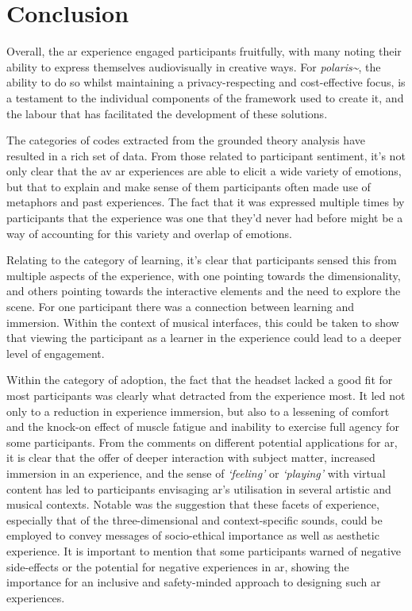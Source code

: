 


\section{Conclusion}\label{sec: polaris-conclusion}
Overall, the \gls{ar} experience engaged participants fruitfully, with many noting their ability to express themselves audiovisually in creative ways. For \textit{polaris\textasciitilde{}}, the ability to do so whilst maintaining a privacy-respecting and cost-effective focus, is a testament to the individual components of the framework used to create it, and the labour that has facilitated the development of these  solutions.

The categories of codes extracted from the grounded theory analysis have resulted in a rich set of data. From those related to participant sentiment, it's not only clear that the \gls{av} \gls{ar} experiences are able to elicit a wide variety of emotions, but that to explain and make sense of them participants often made use of metaphors and past experiences. The fact that it was expressed multiple times by participants that the experience was one that they'd never had before might be a way of accounting for this variety and overlap of emotions.

Relating to the category of learning, it's clear that participants sensed this from multiple aspects of the experience, with one pointing towards the dimensionality, and others pointing towards the interactive elements and the need to explore the scene. For one participant there was a connection between learning and immersion. Within the context of musical interfaces, this could be taken to show that viewing the participant as a learner in the experience could lead to a deeper level of engagement.

Within the category of adoption, the fact that the headset lacked a good fit for most participants was clearly what detracted from the experience most. It led not only to a reduction in experience immersion, but also to a lessening of comfort and the knock-on effect of muscle fatigue and inability to exercise full agency for some participants. From the comments on different potential applications for \gls{ar}, it is clear that the offer of deeper interaction with subject matter, increased immersion in an experience, and the sense of \textit{`feeling'} or \textit{`playing'} with virtual content has led to participants envisaging \gls{ar}'s utilisation in several artistic and musical contexts. Notable was the suggestion that these facets of experience, especially that of the three-dimensional and context-specific sounds, could be employed to convey messages of socio-ethical importance as well as aesthetic experience. It is important to mention that some participants warned of negative side-effects or the potential for negative experiences in \gls{ar}, showing the importance for an inclusive and safety-minded approach to designing such \gls{ar} experiences.

